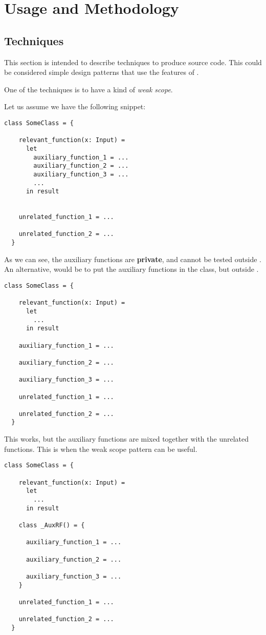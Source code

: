 \chapter{Usage and Methodology}

\section{Techniques}

This section is intended to describe techniques to produce \Soda source code.
This could be considered simple design patterns that use the features of \Soda.

One of the techniques is to have a kind of \textit{weak scope}.

Let us assume we have the following snippet:
\begin{lstlisting}[label={lst:techniquesWeakScope0}]
  class SomeClass = {

    relevant_function(x: Input) =
      let
        auxiliary_function_1 = ...
        auxiliary_function_2 = ...
        auxiliary_function_3 = ...
        ...
      in result


    unrelated_function_1 = ...

    unrelated_function_2 = ...
  }
\end{lstlisting}

As we can see, the auxiliary functions are \textbf{private}, and cannot be tested outside .
An alternative, would be to put the auxiliary functions in the class, but outside .

\begin{lstlisting}[label={lst:techniquesWeakScope1}]
  class SomeClass = {

    relevant_function(x: Input) =
      let
        ...
      in result

    auxiliary_function_1 = ...

    auxiliary_function_2 = ...

    auxiliary_function_3 = ...

    unrelated_function_1 = ...

    unrelated_function_2 = ...
  }
\end{lstlisting}

This works, but the auxiliary functions are mixed together with the unrelated functions.
This is when the weak scope pattern can be useful.

\begin{lstlisting}[label={lst:techniquesWeakScope2}]
  class SomeClass = {

    relevant_function(x: Input) =
      let
        ...
      in result

    class _AuxRF() = {

      auxiliary_function_1 = ...

      auxiliary_function_2 = ...

      auxiliary_function_3 = ...
    }

    unrelated_function_1 = ...

    unrelated_function_2 = ...
  }
\end{lstlisting}

